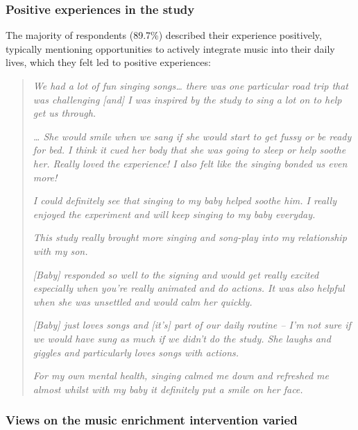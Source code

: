 \documentclass[
]{article}
\begin{document}
\subsubsection*{Positive experiences in the
study}\label{positive-experiences-in-the-study}

The majority of respondents (89.7\%) described their experience
positively, typically mentioning opportunities to actively integrate
music into their daily lives, which they felt led to positive
experiences:

\begin{quote}
\textit{We had a lot of fun singing songs… there was one particular road trip that was challenging [and] I was inspired by the study to sing a lot on to help get us through.}
  
\textit{… She would smile when we sang if she would start to get fussy or be ready for bed. I think it cued her body that she was going to sleep or help soothe her. Really loved the experience! I also felt like the singing bonded us even more!}
  
\textit{I could definitely see that singing to my baby helped soothe him. I really enjoyed the experiment and will keep singing to my baby everyday.}
  
\textit{This study really brought more singing and song-play into my relationship with my son.}
  
\textit{[Baby] responded so well to the signing and would get really excited especially when you're really animated and do actions. It was also helpful when she was unsettled and would calm her quickly.}
  
\textit{[Baby] just loves songs and [it’s] part of our daily routine – I’m not sure if we would have sung as much if we didn’t do the study. She laughs and giggles and particularly loves songs with actions.}
  
\textit{For my own mental health, singing calmed me down and refreshed me almost whilst with my baby it definitely put a smile on her face.}
\end{quote}

\subsubsection*{Views on the music enrichment intervention
varied}\label{views-on-the-music-enrichment-intervention-varied}
\end{document}
